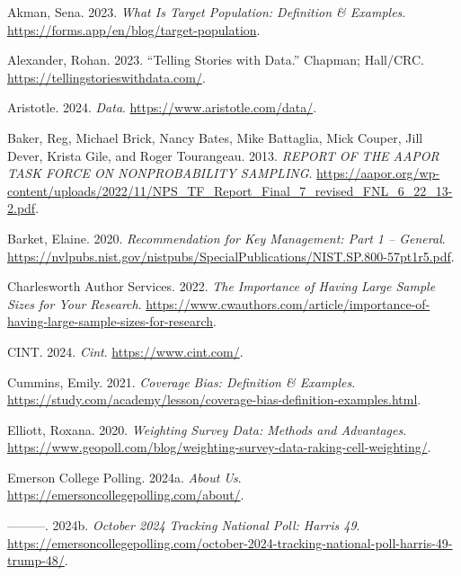 \documentclass[
  letterpaper,
  DIV=11,
  numbers=noendperiod]{scrartcl}
\newlength{\cslhangindent}
\newlength{\cslentryspacingunit} %
\newenvironment{CSLReferences}[2] %
 {%
  \setlength{\parindent}{0pt}
  \ifodd #1
  \let\oldpar\par
  \def\par{\hangindent=\cslhangindent\oldpar}
  \fi
  \setlength{\parskip}{#2\cslentryspacingunit}
 }%
 {}
\begin{document}
\hypertarget{refs}{}
\begin{CSLReferences}{1}{0}
\leavevmode{}%
Akman, Sena. 2023. \emph{What Is Target Population: Definition \&
Examples}. \url{https://forms.app/en/blog/target-population}.

\leavevmode{}%
Alexander, Rohan. 2023. {``Telling Stories with Data.''} Chapman;
Hall/CRC. \url{https://tellingstorieswithdata.com/}.

\leavevmode{}%
Aristotle. 2024. \emph{Data}. \url{https://www.aristotle.com/data/}.

\leavevmode{}%
Baker, Reg, Michael Brick, Nancy Bates, Mike Battaglia, Mick Couper,
Jill Dever, Krista Gile, and Roger Tourangeau. 2013. \emph{REPORT OF THE
AAPOR TASK FORCE ON NONPROBABILITY SAMPLING}.
\url{https://aapor.org/wp-content/uploads/2022/11/NPS_TF_Report_Final_7_revised_FNL_6_22_13-2.pdf}.

\leavevmode{}%
Barket, Elaine. 2020. \emph{Recommendation for Key Management: Part 1 --
General}.
\url{https://nvlpubs.nist.gov/nistpubs/SpecialPublications/NIST.SP.800-57pt1r5.pdf}.

\leavevmode{}%
Charlesworth Author Services. 2022. \emph{The Importance of Having Large
Sample Sizes for Your Research}.
\url{https://www.cwauthors.com/article/importance-of-having-large-sample-sizes-for-research}.

\leavevmode{}%
CINT. 2024. \emph{Cint}. \url{https://www.cint.com/}.

\leavevmode{}%
Cummins, Emily. 2021. \emph{Coverage Bias: Definition \& Examples}.
\url{https://study.com/academy/lesson/coverage-bias-definition-examples.html}.

\leavevmode{}%
Elliott, Roxana. 2020. \emph{Weighting Survey Data: Methods and
Advantages}.
\url{https://www.geopoll.com/blog/weighting-survey-data-raking-cell-weighting/}.

\leavevmode{}%
Emerson College Polling. 2024a. \emph{About Us}.
\url{https://emersoncollegepolling.com/about/}.

\leavevmode{}%
---------. 2024b. \emph{October 2024 Tracking National Poll: Harris 49}.
\url{https://emersoncollegepolling.com/october-2024-tracking-national-poll-harris-49-trump-48/}.


\end{CSLReferences}
\end{document}
